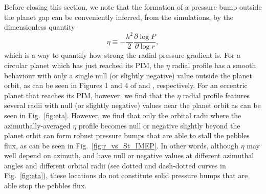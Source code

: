 \documentclass[fleqn,usenatbib]{mnras}
\begin{document}
Before closing this section, we note that the formation of a pressure bump outside the planet gap can be conveniently inferred, from the simulations, by the dimensionless quantity
\begin{equation}
\eta\equiv-\frac{h^2}{2}\frac{\partial\log P}{\partial \log r},
 \label{eq:eta_p}
\end{equation}
which is a way to quantify how strong the radial pressure gradient is. For a circular planet which has just reached its PIM, the $\eta$ radial profile has a smooth behaviour with only a single null (or slightly negative) value outside the planet orbit, as can be seen in Figures 1 and 4 of \citet{Ataiee_etal2018} and \citet{Bitsch_etal2018}, respectively. For an eccentric planet that reaches its PIM, however, we find that the $\eta$ radial profile features several radii with null (or slightly negative) values near the planet orbit as can be seen in Fig.~\ref{fig:eta}. However, we find that only the orbital radii where the azimuthally-averaged $\eta$ profile becomes null or negative slightly beyond the planet orbit can form robust pressure bumps that are able to stall the pebbles flux, as can be seen in Fig.~\ref{fig:r_vs_St_IMEP}. In other words, although $\eta$ may well depend on azimuth, and have null or negative values at different azimuthal angles and different orbital radii (see dotted and dash-dotted curves in Fig.~\ref{fig:eta}), these locations do not constitute solid pressure bumps that are able stop the pebbles flux.
\end{document}
